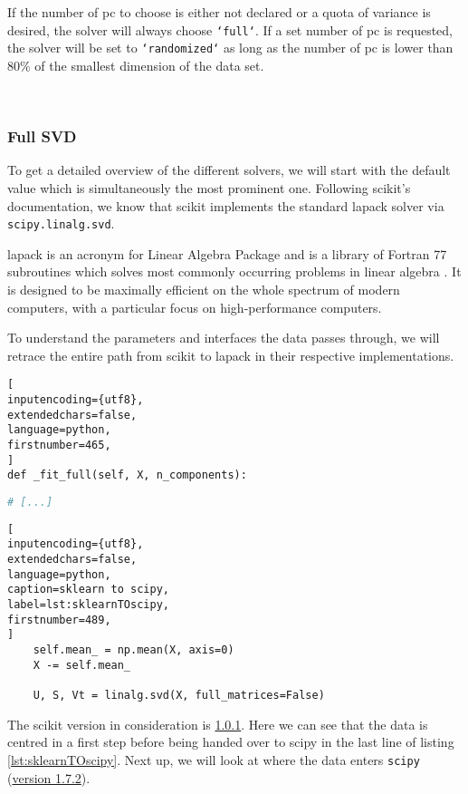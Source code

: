 If the number of \gls{pc} to choose is either not declared or a quota of variance is desired, the solver will always choose \texttt{`full`}.
If a set number of \gls{pc} is requested, the solver will be set to \texttt{`randomized`} as long as the number of \gls{pc} is lower than 80\% of the smallest dimension of the data set.


\ \clearpage


\subsubsection{Full SVD} \label{sec:fullSVD}

To get a detailed overview of the different solvers, we will start with the default value which is simultaneously the most prominent one.
Following \gls{scikit}'s documentation, we know that \gls{scikit} implements the standard \acrshort{lapack} solver via \texttt{scipy.linalg.svd}.
\bigskip

\acrshort{lapack} is an acronym for Linear Algebra Package and is a library of Fortran 77 subroutines which solves most commonly occurring problems in linear algebra \cite{anderson1999lapack}.
It is designed to be maximally efficient on the whole spectrum of modern computers, with a particular focus on high-performance computers.

To understand the parameters and interfaces the data passes through, we will retrace the entire path from \gls{scikit} to \acrshort{lapack} in their respective implementations.


\begin{lstlisting}[
inputencoding={utf8}, 
extendedchars=false, 
language=python,
firstnumber=465,
]
def _fit_full(self, X, n_components):
\end{lstlisting}
%
%
%
\spacingConcatLists
\begin{lstlisting}[language=python, numbers=none]
     # [...]
\end{lstlisting}
%
%
%
\spacingConcatLists
\begin{lstlisting}[
inputencoding={utf8}, 
extendedchars=false, 
language=python, 
caption=sklearn to scipy, 
label=lst:sklearnTOscipy,
firstnumber=489,
]
    self.mean_ = np.mean(X, axis=0)
    X -= self.mean_

    U, S, Vt = linalg.svd(X, full_matrices=False)
\end{lstlisting}



\noindent
The \gls{scikit} version in consideration is \href{\scikitPCAvIxOxI{_pca}}{1.0.1}.
Here we can see that the data is centred in a first step before being handed over to scipy in the last line of listing \ref{lst:sklearnTOscipy}.
Next up, we will look at where the data enters \texttt{scipy} (\href{\scipyvIxVIIxII{decomp_svd}}{version 1.7.2}).



